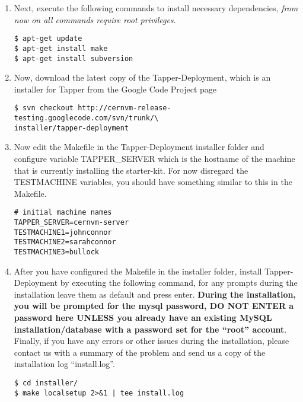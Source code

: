 \begin{enumerate}
\item 	Next, execute the following commands to install necessary dependencies, \emph{from now on all commands require root privileges}.

\lstset{language=bash,caption= Install Dependencies}
\begin{lstlisting}
$ apt-get update
$ apt-get install make
$ apt-get install subversion
\end{lstlisting}

\item 	Now, download the latest copy of the Tapper-Deployment, which is an installer for Tapper from the \cernvmreleasetesting 
		Google Code Project page

\lstset{language=bash,caption= Download Tapper-Deployment}
\begin{lstlisting}
$ svn checkout http://cernvm-release-testing.googlecode.com/svn/trunk/\
installer/tapper-deployment
\end{lstlisting}

\item 	Now edit the Makefile in the Tapper-Deployment installer folder and configure variable TAPPER\_SERVER which 
		is the hostname of the machine that is currently installing the starter-kit. For now disregard the TESTMACHINE 
		variables, you should have something similar to this in the Makefile.

\lstset{language=bash,caption= Makefile Configuration}
\begin{lstlisting}
# initial machine names
TAPPER_SERVER=cernvm-server
TESTMACHINE1=johnconnor
TESTMACHINE2=sarahconnor
TESTMACHINE3=bullock
\end{lstlisting}

\item	After you have configured the Makefile in the installer folder, install Tapper-Deployment by executing the
		following command, for any prompts during the installation leave them as default and press enter. {\bf During
		the installation, you will be prompted for the mysql password, DO NOT ENTER a password here UNLESS you already have an
		existing MySQL installation/database with a password set for the ``root'' account}. Finally, if you have any errors or
		other issues during the installation, please contact us with a summary of the problem and send us a copy of the installation 
		log ``install.log''.

\lstset{language=bash,caption= Install Tapper-Deployment}
\begin{lstlisting}
$ cd installer/
$ make localsetup 2>&1 | tee install.log
\end{lstlisting}
\end{enumerate}




